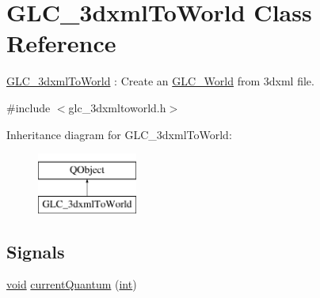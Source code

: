 \hypertarget{class_g_l_c__3dxml_to_world}{\section{G\-L\-C\-\_\-3dxml\-To\-World Class Reference}
\label{class_g_l_c__3dxml_to_world}
}


\hyperlink{class_g_l_c__3dxml_to_world}{G\-L\-C\-\_\-3dxml\-To\-World} \-: Create an \hyperlink{class_g_l_c___world}{G\-L\-C\-\_\-\-World} from 3dxml file.  




{\ttfamily \#include $<$glc\-\_\-3dxmltoworld.\-h$>$}

Inheritance diagram for G\-L\-C\-\_\-3dxml\-To\-World\-:\begin{figure}[H]
\begin{center}
\leavevmode
\includegraphics[height=2.000000cm]{class_g_l_c__3dxml_to_world}
\end{center}
\end{figure}
\subsection*{Signals}
\begin{DoxyCompactItemize}
\item 
\hyperlink{group___u_a_v_objects_plugin_ga444cf2ff3f0ecbe028adce838d373f5c}{void} \hyperlink{class_g_l_c__3dxml_to_world_ab331f05c3e6042d5f332f9371944b338}{current\-Quantum} (\hyperlink{ioapi_8h_a787fa3cf048117ba7123753c1e74fcd6}{int})
\end{DoxyCompactItemize}
